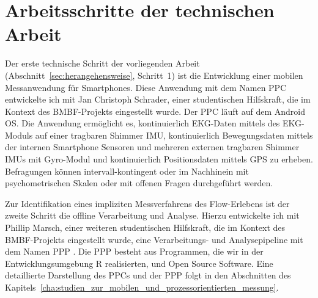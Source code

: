 

\section{Arbeitsschritte der technischen Arbeit} 

\label{sec:arbeitsschritte_der_technischen_arbeit}

Der erste technische Schritt der vorliegenden Arbeit (Abschnitt~\ref{sec:herangehensweise}, Schritt~1) ist die Entwicklung einer mobilen Messanwendung für Smartphones. Diese Anwendung mit dem Namen \ac{PPC} \citep{Bogutzky2016} entwickelte ich mit Jan Christoph Schrader, einer studentischen Hilfskraft, die im Kontext des \acs{BMBF}-Projekts eingestellt wurde. Der \ac{PPC} läuft auf dem Android OS. Die Anwendung ermöglicht es, kontinuierlich \ac{EKG}-Daten mittels des \ac{EKG}-Moduls auf einer tragbaren Shimmer \ac{IMU}, kontinuierlich Bewegungsdaten mittels der internen Smartphone Sensoren und mehreren externen tragbaren Shimmer \ac{IMU}s mit Gyro-Modul und kontinuierlich Positionsdaten mittels \acs{GPS} zu erheben. Befragungen können intervall-kontingent oder im Nachhinein mit psychometrischen Skalen oder mit offenen Fragen durchgeführt werden.

Zur Identifikation eines impliziten Messverfahrens des Flow-Erlebens ist der zweite Schritt die offline Verarbeitung und Analyse. Hierzu entwickelte ich mit Phillip Marsch, einer weiteren studentischen Hilfskraft, die im Kontext des \acs{BMBF}-Projekts eingestellt wurde, eine Verarbeitungs- und Analysepipeline mit dem Namen \ac{PPP} \citep{Bogutzky2016a}. Die \ac{PPP} besteht aus Programmen, die wir in der Entwicklungsumgebung R realisierten, und Open Source Software. Eine detaillierte Darstellung des \ac{PPC}s und der \ac{PPP} folgt in den Abschnitten des Kapitels~\ref{cha:studien_zur_mobilen_und_prozessorientierten_messung}.


